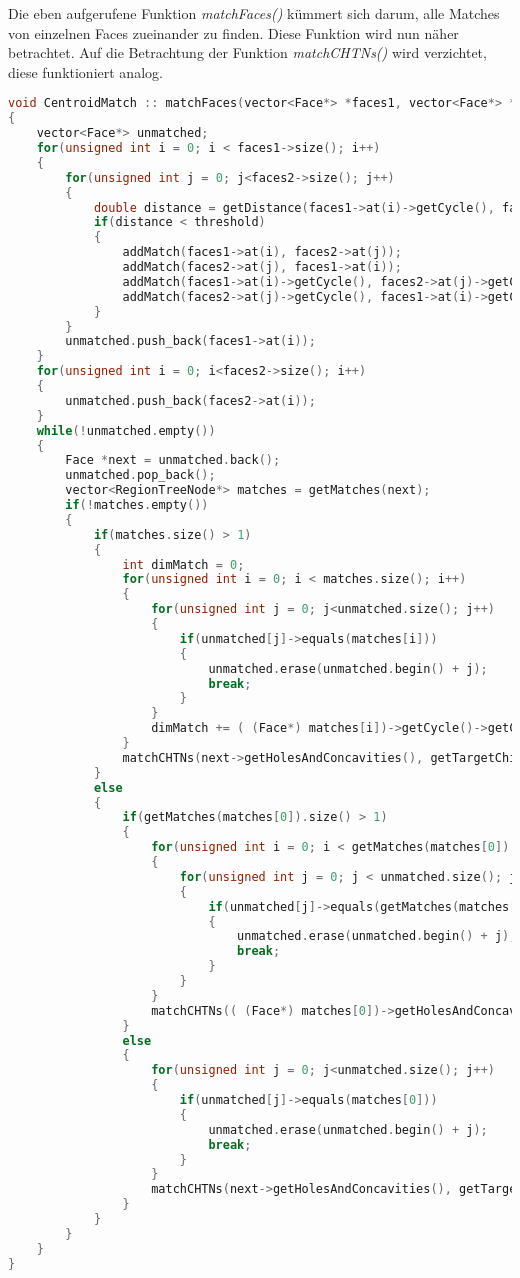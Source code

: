 Die eben aufgerufene Funktion \textit{matchFaces()} kümmert sich darum, alle Matches von einzelnen Faces zueinander zu finden. Diese Funktion wird nun näher betrachtet. Auf die Betrachtung der Funktion \textit{matchCHTNs()} wird verzichtet, diese funktioniert analog.
\begin{lstlisting}[language=c++]
void CentroidMatch :: matchFaces(vector<Face*> *faces1, vector<Face*> *faces2)
{
	vector<Face*> unmatched;
	for(unsigned int i = 0; i < faces1->size(); i++)
	{
		for(unsigned int j = 0; j<faces2->size(); j++)
		{            
			double distance = getDistance(faces1->at(i)->getCycle(), faces2->at(j)->getCycle());
			if(distance < threshold)
			{
				addMatch(faces1->at(i), faces2->at(j));
				addMatch(faces2->at(j), faces1->at(i));
				addMatch(faces1->at(i)->getCycle(), faces2->at(j)->getCycle());
				addMatch(faces2->at(j)->getCycle(), faces1->at(i)->getCycle());
			}
		}
		unmatched.push_back(faces1->at(i));
	}
	for(unsigned int i = 0; i<faces2->size(); i++)
	{
		unmatched.push_back(faces2->at(i));
	}    
	while(!unmatched.empty())
	{
		Face *next = unmatched.back();
		unmatched.pop_back();
		vector<RegionTreeNode*> matches = getMatches(next);
		if(!matches.empty())
		{
			if(matches.size() > 1)
			{
				int dimMatch = 0;
				for(unsigned int i = 0; i < matches.size(); i++)
				{
					for(unsigned int j = 0; j<unmatched.size(); j++)
					{
						if(unmatched[j]->equals(matches[i]))
						{
							unmatched.erase(unmatched.begin() + j);
							break;
						}
					}                                       
					dimMatch += ( (Face*) matches[i])->getCycle()->getChildren()->size();
				}      
				matchCHTNs(next->getHolesAndConcavities(), getTargetChildren(next));	                
			}
			else
			{
				if(getMatches(matches[0]).size() > 1)
				{
					for(unsigned int i = 0; i < getMatches(matches[0]).size(); i++)
					{
						for(unsigned int j = 0; j < unmatched.size(); j++)
						{
							if(unmatched[j]->equals(getMatches(matches[0])[i]))
							{
								unmatched.erase(unmatched.begin() + j);
								break;
							}
						}                        
					}      
					matchCHTNs(( (Face*) matches[0])->getHolesAndConcavities(), getTargetChildren(matches[0]));
				}
				else
				{
					for(unsigned int j = 0; j<unmatched.size(); j++)
					{
						if(unmatched[j]->equals(matches[0]))
						{
							unmatched.erase(unmatched.begin() + j);
							break;
						}
					}   	
					matchCHTNs(next->getHolesAndConcavities(), getTargetChildren(next));                    
				}
			}
		}
	}
}
\end{lstlisting}


